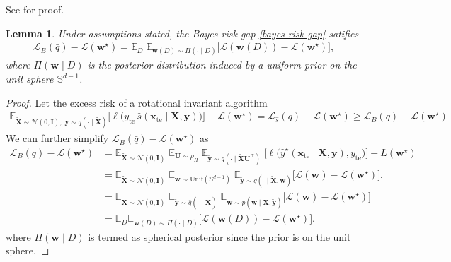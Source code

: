 \documentclass{article}
\theoremstyle{plain}
\newtheorem{lemma}[theorem]{Lemma}
\theoremstyle{definition}
\theoremstyle{remark}
\begin{document}
{See \cite{pmlr-v272-warmuth25a} for proof. 



\begin{lemma}
\label{lem:spherical-posterior-restate}
Under assumptions stated, the Bayes risk gap \eqref{bayes-risk-gap} satifies
\begin{align}
\mathcal{L}_B(\bar q) - \mathcal{L}(\boldsymbol w^\star)
=
\mathbb E_{D}
\;
\mathbb E_{\boldsymbol w(D)\sim \Pi(\cdot\mid D)}
\Big[
\mathcal L(\boldsymbol w(D)) - \mathcal L(\boldsymbol w^\star)
\Big],
\end{align}
where $\Pi(\boldsymbol w\mid D)$ is the posterior distribution induced by a uniform
prior on the unit sphere $\mathbb S^{d-1}$.
\end{lemma}
\begin{proof}
    

Let the excess risk of a rotational invariant algorithm 
\begin{align}
    \mathbb E_{\tilde{\boldsymbol X}\sim  \mathcal{N}(0,\mathbf{I}),\;
\tilde{\boldsymbol y}\sim q(\cdot\mid \tilde{\boldsymbol X})}
\Big[
\ell\!\big(
y_{\mathrm{te}}\,
\hat s(\boldsymbol x_{\mathrm{te}}\mid \boldsymbol X,\boldsymbol y)
\big)
\Big] - \mathcal{L}(\mathbf{w}^{\star}) = \mathcal{L}_{\hat{s}}(q) -\mathcal{L}(\mathbf{w}^{\star})  \geq \mathcal{L}_B(\bar q) -\mathcal{L}(\mathbf{w}^{\star})
\end{align}
We can further simplify  $\mathcal{L}_B(\bar q) -\mathcal{L}(\mathbf{w}^{\star}) $ as 
\begin{align}
\mathcal{L}_B(\bar q) - \mathcal{L}(\boldsymbol w^\star)
&=
\mathbb E_{\tilde{\boldsymbol X}\sim\mathcal{N}(0,\mathbf{I})}
\;\mathbb E_{\boldsymbol U\sim\rho_H}
\;\mathbb E_{\tilde{\boldsymbol y}\sim q(\cdot\mid \tilde{\boldsymbol X}\boldsymbol U^{\top})}
\;
\Big[
\ell\!\big(\hat y^\star(\boldsymbol x_{\mathrm{te}}\mid \boldsymbol X,\boldsymbol y),y_{\mathrm{te}}\big)
\Big]
- L(\boldsymbol w^\star)
\\[0.8em]
&=
\mathbb E_{\tilde{\boldsymbol X}\sim \mathcal{N}(0,\mathbf{I})}
\;\mathbb E_{\boldsymbol w\sim\mathrm{Unif}(\mathbb S^{d-1})}
\;\mathbb E_{\tilde{\boldsymbol y}\sim q(\cdot\mid \tilde{\boldsymbol X},\boldsymbol w)} 
\Big[
\mathcal{L}(\boldsymbol w)  
- \mathcal{L}(\boldsymbol w^\star)
\Big]. \label{w_sphere} \\
& = \mathbb E_{\tilde{\boldsymbol X}\sim \mathcal{N}(0,\mathbf{I})}
\;\mathbb E_{\tilde{\boldsymbol y}\sim \bar q(\cdot\mid \tilde{\boldsymbol X})}
\;\mathbb E_{\boldsymbol w\sim p(\boldsymbol w\mid \tilde{\boldsymbol X},\tilde{\boldsymbol y})}
\Big[
\mathcal{L}(\boldsymbol w) - \mathcal{L}(\boldsymbol w^\star)
\Big]  \\
& = \mathbb E_{D} \mathbb{E}_{\mathbf{w}(D) \sim \Pi(\cdot \mid D)}
\Big[
\mathcal{L}(\mathbf{w}(D)) - \mathcal{L}(\mathbf{w}^\star)
\Big].
\end{align}
where $\Pi(\mathbf{w} \mid D)$ is termed as spherical posterior since the prior is on the unit sphere. 


\end{proof}}
\end{document}
